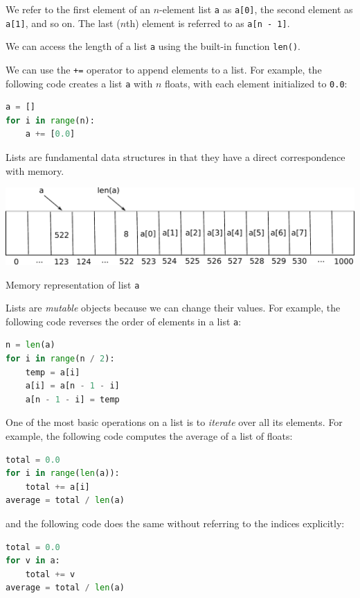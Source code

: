 \documentclass[8pt,a4paper,compress,handout]{beamer}
\begin{document}
\begin{frame}[fragile]
We refer to the first element of an $n$-element list \lstinline{a} as \lstinline{a[0]}, the second element as \lstinline{a[1]}, and so on. The last ($n$th) element is referred to as \lstinline{a[n - 1]}.

\bigskip

We can access the length of a list \lstinline{a} using the built-in function \lstinline{len()}. 

\bigskip

We can use the \lstinline{+=} operator to append elements to a list. For example, the following code creates a list \lstinline{a} with $n$ floats, with each element initialized to \lstinline{0.0}:

\begin{lstlisting}[language=Python]
a = []
for i in range(n):
    a += [0.0]
\end{lstlisting} 

\bigskip


Lists are fundamental data structures in that they have a direct correspondence with memory. 

\begin{center}
\includegraphics[scale=0.4]{figures/list_rep.pdf}

\smallskip

\tiny Memory representation of list \lstinline{a}
\end{center}
\end{frame}

\begin{frame}[fragile]
Lists are \emph{mutable} objects because we can change their values. For example, the following code reverses the order of elements in a list \lstinline{a}:

\begin{lstlisting}[language=Python]
n = len(a)
for i in range(n / 2):
    temp = a[i]
    a[i] = a[n - 1 - i]
    a[n - 1 - i] = temp
\end{lstlisting}

\bigskip

One of the most basic operations on a list is to \emph{iterate} over all its elements. For example, the following code computes the average of a list of floats:

\begin{lstlisting}[language=Python]
total = 0.0
for i in range(len(a)):
    total += a[i]
average = total / len(a)
\end{lstlisting}

and the following code does the same without referring to the indices explicitly:

\begin{lstlisting}[language=Python]
total = 0.0
for v in a:
    total += v
average = total / len(a)
\end{lstlisting}
\end{frame}
\end{document}
